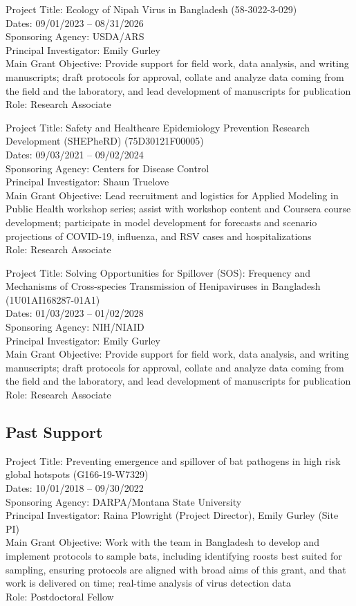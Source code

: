 \documentclass{cv}
\begin{document}
Project Title: Ecology of Nipah Virus in Bangladesh (58-3022-3-029) \\
Dates: 09/01/2023 -- 08/31/2026 \\
Sponsoring Agency: USDA/ARS \\
Principal Investigator: Emily Gurley \\
Main Grant Objective: Provide support for field work, data analysis, and writing manuscripts; draft protocols for approval, collate and analyze data coming from the field and the laboratory, and lead development of manuscripts for publication \\
Role: Research Associate

Project Title: Safety and Healthcare Epidemiology Prevention Research Development (SHEPheRD) (75D30121F00005) \\
Dates: 09/03/2021 -- 09/02/2024 \\
Sponsoring Agency: Centers for Disease Control \\
Principal Investigator: Shaun Truelove \\
Main Grant Objective: Lead recruitment and logistics for Applied Modeling in Public Health workshop series; assist with workshop content and Coursera course development; participate in model development for forecasts and scenario projections of COVID-19, influenza, and RSV cases and hospitalizations \\
Role: Research Associate

Project Title: Solving Opportunities for Spillover (SOS): Frequency and Mechanisms of Cross-species Transmission of Henipaviruses in Bangladesh (1U01AI168287-01A1) \\
Dates: 01/03/2023 -- 01/02/2028 \\
Sponsoring Agency: NIH/NIAID \\
Principal Investigator: Emily Gurley \\
Main Grant Objective: Provide support for field work, data analysis, and writing manuscripts; draft protocols for approval, collate and analyze data coming from the field and the laboratory, and lead development of manuscripts for publication \\
Role: Research Associate

\subsection*{Past Support}

Project Title: Preventing emergence and spillover of bat pathogens in high risk global hotspots (G166-19-W7329) \\
Dates: 10/01/2018 -- 09/30/2022 \\
Sponsoring Agency: DARPA/Montana State University \\
Principal Investigator: Raina Plowright (Project Director), Emily Gurley (Site PI) \\
Main Grant Objective: Work with the team in Bangladesh to develop and implement protocols to sample bats, including identifying roosts best suited for sampling, ensuring protocols are aligned with broad aims of this grant, and that work is delivered on time; real-time analysis of virus detection data \\
Role: Postdoctoral Fellow
\end{document}

